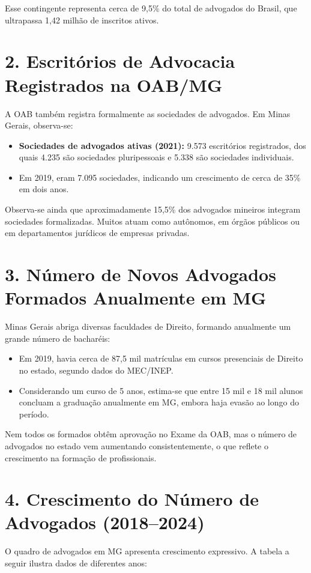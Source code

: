 \documentclass{article}
\begin{document}
Esse contingente representa cerca de 9,5\% do total de advogados do Brasil, que ultrapassa 1,42 milhão de inscritos ativos.

\section{2. Escritórios de Advocacia Registrados na OAB/MG}
A OAB também registra formalmente as sociedades de advogados. Em Minas Gerais, observa-se:
\begin{itemize}
\item \textbf{Sociedades de advogados ativas (2021):} 9.573 escritórios registrados, dos quais 4.235 são sociedades pluripessoais e 5.338 são sociedades individuais.
\item Em 2019, eram 7.095 sociedades, indicando um crescimento de cerca de 35\% em dois anos.
\end{itemize}

Observa-se ainda que aproximadamente 15,5\% dos advogados mineiros integram sociedades formalizadas. Muitos atuam como autônomos, em órgãos públicos ou em departamentos jurídicos de empresas privadas.

\section{3. Número de Novos Advogados Formados Anualmente em MG}
Minas Gerais abriga diversas faculdades de Direito, formando anualmente um grande número de bacharéis:
\begin{itemize}
\item Em 2019, havia cerca de 87,5 mil matrículas em cursos presenciais de Direito no estado, segundo dados do MEC/INEP.
\item Considerando um curso de 5 anos, estima-se que entre 15 mil e 18 mil alunos concluam a graduação anualmente em MG, embora haja evasão ao longo do período.
\end{itemize}

Nem todos os formados obtêm aprovação no Exame da OAB, mas o número de advogados no estado vem aumentando consistentemente, o que reflete o crescimento na formação de profissionais.

\section{4. Crescimento do Número de Advogados (2018--2024)}
O quadro de advogados em MG apresenta crescimento expressivo. A tabela a seguir ilustra dados de diferentes anos:
\end{document}
